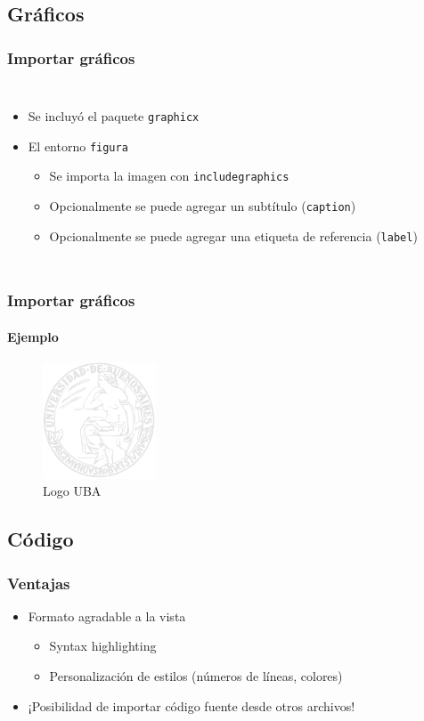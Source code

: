 \documentclass[svgnames]{beamer}
\begin{document}
\subsection{Gráficos}

\begin{frame}[fragile]
  \frametitle{Importar gráficos}
  \begin{columns}
    \centering
      
    \centering
      \begin{itemize}
        \item Se incluyó el paquete \texttt{graphicx}
        \item El entorno \texttt{figura}
        \begin{itemize}
            \item Se importa la imagen con \texttt{includegraphics}
            \item Opcionalmente se puede agregar un subtítulo (\texttt{caption})
            \item Opcionalmente se puede agregar una etiqueta de referencia (\texttt{label})
        \end{itemize}
      \end{itemize}
  \end{columns}
\end{frame}

\begin{frame}[fragile]
  \frametitle{Importar gráficos}
  \framesubtitle{Ejemplo}
  
  \begin{figure}
    \includegraphics[width=0.3\textwidth]{graficos/logo_uba}
    \caption{Logo UBA}
    \label{fig:logo_uba}
  \end{figure}
\end{frame}

\subsection{Código}

\begin{frame}
  \frametitle{Ventajas}
  \begin{itemize}
   \item Formato agradable a la vista
   \begin{itemize}
    \item Syntax highlighting
    \item Personalización de estilos (números de líneas, colores)
   \end{itemize}
   \item ¡Posibilidad de importar código fuente desde otros archivos!
  \end{itemize}
\end{frame}
\end{document}
